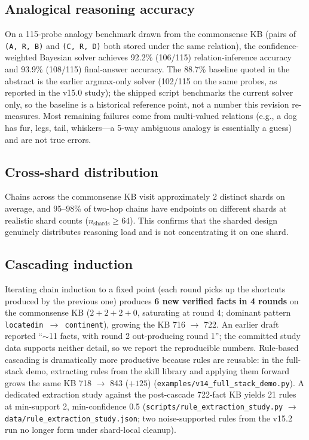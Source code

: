 \documentclass[11pt]{article}
\begin{document}
\subsection{Analogical reasoning accuracy}

On a 115-probe analogy benchmark drawn from the commonsense KB
(pairs of \texttt{(A, R, B)} and \texttt{(C, R, D)} both stored
under the same relation), the confidence-weighted Bayesian solver
achieves 92.2\% (106/115) relation-inference accuracy and 93.9\%
(108/115) final-answer accuracy. The 88.7\% baseline quoted in the
abstract is the earlier argmax-only solver (102/115 on the same
probes, as reported in the v15.0 study); the shipped script
benchmarks the current solver only, so the baseline is a historical
reference point, not a number this revision re-measures. Most
remaining failures come from multi-valued relations (e.g., a dog
has fur, legs, tail, whiskers---a 5-way ambiguous analogy is
essentially a guess) and
are not true errors.

\subsection{Cross-shard distribution}

Chains across the commonsense KB visit approximately 2 distinct
shards on average, and 95--98\% of two-hop chains have endpoints
on different shards at realistic shard counts ($n_{\text{shards}}
\geq 64$). This confirms that the sharded design genuinely
distributes reasoning load and is not concentrating it on one
shard.

\subsection{Cascading induction}

Iterating chain induction to a fixed point (each round picks up the
shortcuts produced by the previous one) produces \textbf{6 new
verified facts in 4 rounds} on the commonsense KB ($2+2+2+0$,
saturating at round 4; dominant pattern
\texttt{locatedin $\to$ continent}), growing the KB 716 $\to$ 722.
An earlier draft reported ``$\sim$11 facts, with round 2
out-producing round 1''; the committed study data supports neither
detail, so we report the reproducible numbers. Rule-based cascading
is dramatically more productive because rules are reusable: in the
full-stack demo, extracting rules from the skill library and
applying them forward grows the same KB 718 $\to$ 843 ($+125$)
(\texttt{examples/v14\_full\_stack\_demo.py}). A dedicated
extraction study against the post-cascade 722-fact KB yields 21
rules at min-support 2, min-confidence 0.5
(\texttt{scripts/rule\_extraction\_study.py} $\to$
\texttt{data/rule\_extraction\_study.json}; two noise-supported
rules from the v15.2 run no longer form under shard-local cleanup).
\end{document}
